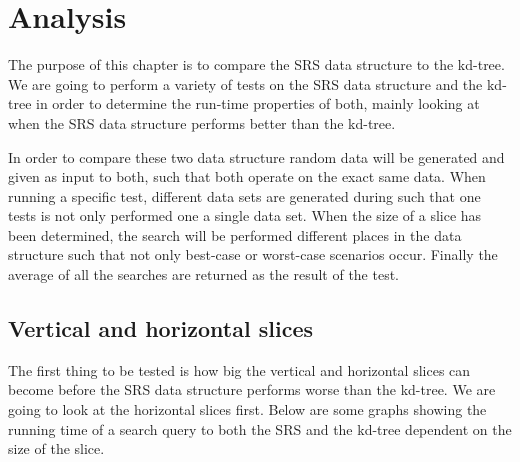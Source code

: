 \chapter{Analysis}
The purpose of this chapter is to compare the SRS data structure to the kd-tree. We are going to perform a variety of tests on the SRS data structure and the kd-tree in order to determine the run-time properties of both, mainly looking at when the SRS data structure performs better than the kd-tree.


In order to compare these two data structure random data will be generated and given as input to both, such that both operate on the exact same data. When running a specific test, different data sets are generated during such that one tests is not only performed one a single data set. When the size of a slice has been determined, the search will be performed different places in the data structure such that not only best-case or worst-case scenarios occur. Finally the average of all the searches are returned as the result of the test.


\section{Vertical and horizontal slices}
The first thing to be tested is how big the vertical and horizontal slices can become before the SRS data structure performs worse than the kd-tree. We are going to look at the horizontal slices first. Below are some graphs showing the running time of a search query to both the SRS and the kd-tree dependent on the size of the slice.

